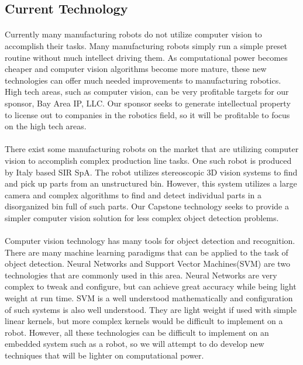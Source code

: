 \documentclass[letterpaper]{article}
\begin{document}
\subsection{Current Technology}
\paragraph{}Currently many manufacturing robots do not utilize computer vision to
accomplish their tasks. Many manufacturing robots simply run a simple preset
routine without much intellect driving them. As computational power becomes
cheaper and computer vision algorithms become more mature, these new
technologies can offer much needed improvements to manufacturing robotics. High
tech areas, such as computer vision, can be very profitable targets for our
sponsor, Bay Area IP, LLC. Our sponsor seeks to generate intellectual property
to license out to companies in the robotics field, so it will be profitable to
focus on the high tech areas. 

\paragraph{} There exist some manufacturing robots on the market that are
utilizing computer vision to accomplish complex production line tasks. One such
robot is produced by Italy based SIR SpA. The robot utilizes stereoscopic 3D
vision systems to find and pick up parts from an unstructured bin. However,
this system utilizes a large camera and complex algorithms to find and detect
individual parts in a disorganized bin full of such parts\cite{SIRfuture}. Our
Capstone technology seeks to provide a simpler computer vision solution for
less complex object detection problems.

\paragraph{} Computer vision technology has many tools for object detection and
recognition.  There are many machine learning paradigms that can be applied to
the task of object detection. Neural Networks and Support Vector Machines(SVM)
are two technologies that are commonly used in this area. Neural Networks are
very complex to tweak and configure, but can achieve great accuracy while being
light weight at run time. SVM is a well understood mathematically and
configuration of such systems is also well understood. They are light weight if
used with simple linear kernels, but more complex kernels would be difficult to
implement on a robot\cite{SVMStackOverflow}. However, all these technologies
can be difficult to implement on an embedded system such as a robot, so we will
attempt to do develop new techniques that will be lighter on computational
power.
\end{document}
